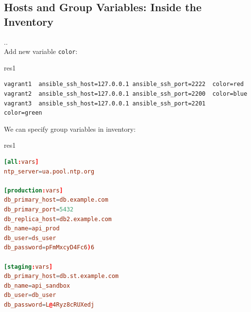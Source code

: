 \documentclass[pdf, 8pt, unicode, t]{beamer} %
\newcommand{\bluetext}[1]{{\usebeamercolor[fg]{bluetext_color}#1}}
\newcommand{\myinsertsubsection}{\alert{\Large\insertsectionnumber.\insertsubsectionnumber. \insertsubsection}\\}
\begin{document}
\subsection{Hosts and Group Variables: Inside the Inventory}
\begin{frame}[fragile]
\myinsertsubsection
\vspace{1em}
\bluetext{Add new variable \texttt{color}:}
\begin{beamercolorbox}[dp=1ex,wd=0.87\textwidth,sep=-0.5em,rounded=true,shadow=true,center]{res1}
\begin{Verbatim}[commandchars=\\\{\}]
vagrant1  ansible_ssh_host=127.0.0.1 ansible_ssh_port=2222  color=red
vagrant2  ansible_ssh_host=127.0.0.1 ansible_ssh_port=2200  color=blue
vagrant3  ansible_ssh_host=127.0.0.1 ansible_ssh_port=2201  color=green
\end{Verbatim}
\end{beamercolorbox}

\vspace{1em}
We can specify group variables in inventory:
\vspace{0.5em}

\begin{beamercolorbox}[dp=1ex,wd=0.87\textwidth,sep=-0.5em,rounded=true,shadow=true,center]{res1}
\begin{lstlisting}[language=conf]
[all:vars]
ntp_server=ua.pool.ntp.org

[production:vars]
db_primary_host=db.example.com
db_primary_port=5432
db_replica_host=db2.example.com
db_name=api_prod
db_user=ds_user
db_password=pFmMxcyD4Fc6)6

[staging:vars]
db_primary_host=db.st.example.com
db_name=api_sandbox
db_user=db_user
db_password=L@4Ryz8cRUXedj
\end{lstlisting}
\end{beamercolorbox}

\end{frame}
\end{document}
